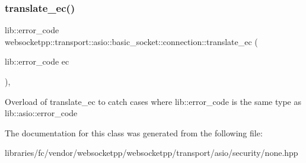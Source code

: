 \subsubsection{\texorpdfstring{translate\+\_\+ec()}{translate\_ec()}\hspace{0.1cm}{\footnotesize\ttfamily [2/2]}}
{\footnotesize\ttfamily lib\+::error\+\_\+code websocketpp\+::transport\+::asio\+::basic\+\_\+socket\+::connection\+::translate\+\_\+ec (\begin{DoxyParamCaption}\item[{lib\+::error\+\_\+code}]{ec }\end{DoxyParamCaption})\hspace{0.3cm}{\ttfamily [inline]}, {\ttfamily [protected]}}

Overload of translate\+\_\+ec to catch cases where lib\+::error\+\_\+code is the same type as lib\+::asio\+::error\+\_\+code 

The documentation for this class was generated from the following file\+:\begin{DoxyCompactItemize}
\item 
libraries/fc/vendor/websocketpp/websocketpp/transport/asio/security/none.\+hpp\end{DoxyCompactItemize}
